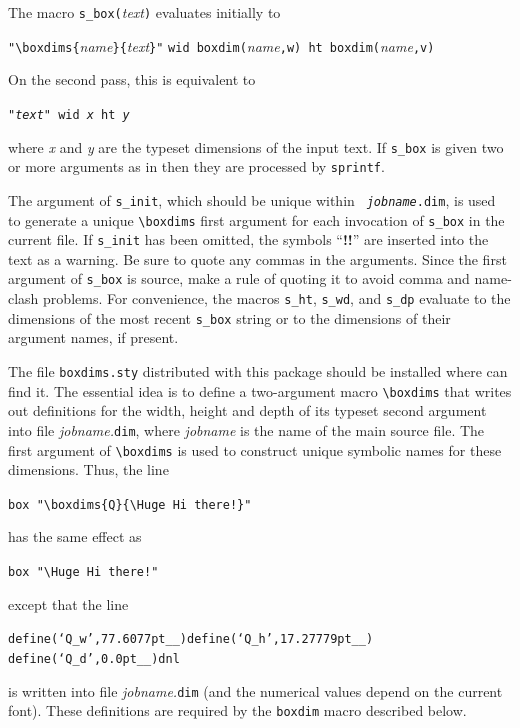 \noindent The macro \verb|s_box(|{\sl text}\verb|)| evaluates initially to

 \verb|"\boxdims{|{\sl name}\verb|}{|{\sl text}\verb|}"|
  \verb|wid boxdim(|{\sl name}\verb|,w) ht boxdim(|{\sl name}\verb|,v)|

\noindent
On the second pass, this is equivalent to

 {\tt "{\sl text}" wid {\sl x} ht {\sl y}}

 \noindent
 where {\sl x} and {\sl y} are the typeset dimensions of the
 \latex input text.  If {\tt s\_box} is given two or more arguments
 as in 
 then they are processed by {\tt sprintf}.

The argument of {\tt s\_init}, which should be unique within {\tt{\sl
jobname}.dim}, is used to generate a unique \verb|\boxdims| first
argument for each invocation of \verb|s_box| in the current file.  If
\verb|s_init| has been omitted, the symbols ``{\bf !!}'' are inserted
into the text as a warning.  Be sure to quote any commas in the
arguments.  Since the first argument of {\tt s\_box} is \latex source,
make a rule of quoting it to avoid comma and name-clash problems.  For
convenience, the macros {\tt s\_ht}, {\tt s\_wd}, and {\tt s\_dp}
evaluate to the dimensions of the most recent {\tt s\_box} string or to
the dimensions of their argument names, if present.

The file \verb|boxdims.sty| distributed with this package should be installed
where \latex can find it.
The essential idea is to define a two-argument \latex macro
\verb|\boxdims| that writes out definitions for the width, height and
depth of its typeset second argument into file {\sl jobname.}\verb|dim|,
where {\sl jobname} is the name of the main source file.
The first argument of \verb|\boxdims| is used to construct unique symbolic
names for these dimensions. 
Thus, the line

{\tt box \verb|"\boxdims{Q}{\Huge Hi there!}"| }

\noindent has the same effect as

{\tt box \verb|"\Huge Hi there!"|}

\noindent except that the line

{\tt define(`Q\_w',77.6077pt\_\_)define(`Q\_h',17.27779pt\_\_)%
define(`Q\_d',0.0pt\_\_)dnl}

\noindent is written into file {\sl jobname.}\verb|dim|
(and the numerical values depend on the current font).
These definitions are required by the \verb|boxdim| macro
described below.

